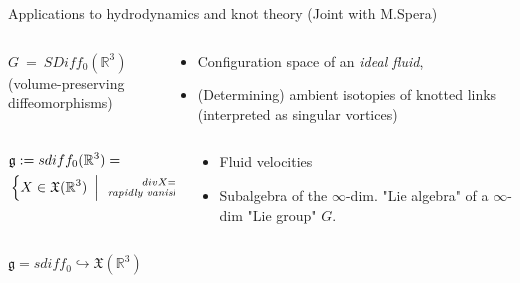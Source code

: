 \documentclass[handout,10pt]{beamer}
\begin{document}
\begin{frame}{Applications to hydrodynamics and knot theory (Joint with M.Spera)}
	\begin{columns}
		\begin{column}{.3\linewidth}
			$G~=~SDiff_0(\mathbb{R}^3)$
			\\
			(volume-preserving diffeomorphisms)
		\end{column}	
		\pause
		\begin{column}{.7\linewidth}
			\begin{itemize}
				\item Configuration space of an \emph{ideal fluid},
				\item (Determining) ambient isotopies of knotted links (interpreted as singular vortices)
			\end{itemize}
		\end{column}
	\end{columns}
	\vfill
	\pause
	\begin{columns}
		\begin{column}{.45\linewidth}
		  	\begin{displaymath}
		  		\begin{split}
		  		&\mathfrak{g}:= sdiff_0(\mathbb{R}^3) = \\
		  		&\left\lbrace  X \in \mathfrak{X}(\mathbb{R}^3) ~\left\vert~ 
		  		\substack{ div X = 0, \\ \textrm{\emph{ rapidly vanishing at }}\infty} \right\rbrace \right.
		  		\end{split}
		  	\end{displaymath}
		\end{column}	
		\begin{column}{.55\linewidth}
			\begin{itemize}
				\item Fluid velocities
				\item Subalgebra of the  $\infty$-dim. "Lie algebra" of a $\infty$-dim "Lie group" $G$.
			\end{itemize}
		\end{column}
	\end{columns}
	\pause
	\vfill
	\begin{columns}
		\begin{column}{.3\linewidth}
			$\mathfrak{g}= sdiff_0 \hookrightarrow  \mathfrak{X}(\mathbb{R}^3)$
		\end{column}
		\begin{column}{.7\linewidth}
			\begin{itemize}

\end{itemize}
\end{column}
\end{columns}
\end{frame}
\end{document}

